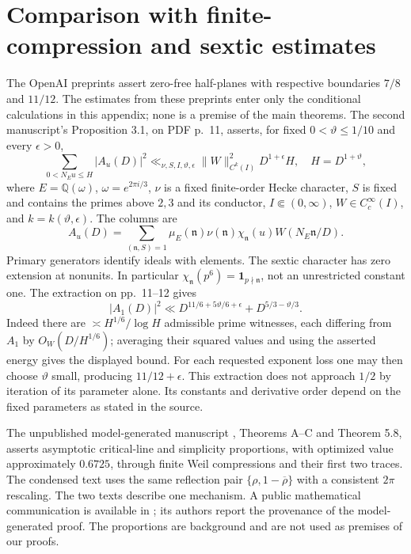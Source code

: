 \documentclass[11pt]{article}
\theoremstyle{remark}\newtheorem{remark}[theorem]{Remark}
\begin{document}
\appendix
\section{Comparison with finite-compression and sextic estimates}\label{app:comparison}
The OpenAI preprints \cite{OpenAI78,OpenAI1112} assert
zero-free half-planes with respective boundaries $7/8$ and $11/12$.
The estimates from these preprints enter only the conditional
calculations in this appendix; none is a premise of the main theorems.
The second manuscript's Proposition 3.1, on PDF p.~11, asserts, for
fixed $0<\vartheta\le1/10$ and every $\epsilon>0$,
\[
 \sum_{0<N_Eu\le H}|A_u(D)|^2
 \ll_{\nu,S,I,\vartheta,\epsilon}\|W\|_{C^k(I)}^2D^{1+\epsilon}H,
 \quad H=D^{1+\vartheta},
\]
where $E=\mathbb Q(\omega)$, $\omega=e^{2\pi i/3}$,
$\nu$ is a fixed finite-order Hecke character, $S$ is fixed and contains
the primes above $2,3$ and its conductor, $I\Subset(0,\infty)$,
$W\in C_c^\infty(I)$, and $k=k(\vartheta,\epsilon)$.
The columns are
\[
 A_u(D)=\sum_{(\mathfrak n,S)=1}
   \mu_E(\mathfrak n)\nu(\mathfrak n)\chi_{\mathfrak n}(u)
   W(N_E\mathfrak n/D).
\]
Primary generators identify ideals with elements. The sextic character
has zero extension at nonunits. In particular
$\chi_{\mathfrak n}(p^6)=\mathbf1_{p\nmid\mathfrak n}$, not an
unrestricted constant one. The extraction on pp.~11--12 gives
\[
 |A_1(D)|^2\ll D^{11/6+5\vartheta/6+\epsilon}
                      +D^{5/3-\vartheta/3}.
\]
Indeed there are $\asymp H^{1/6}/\log H$ admissible prime witnesses,
each differing from $A_1$ by $O_W(D/H^{1/6})$; averaging their squared
values and using the asserted energy gives the displayed bound.
For each requested exponent loss one may then choose $\vartheta$
small, producing $11/12+\epsilon$. This extraction does not approach
$1/2$ by iteration of its parameter alone. Its constants and derivative
order depend on the fixed parameters as stated in the source.

The unpublished model-generated manuscript \cite{ClaudeFull}, Theorems A--C and
Theorem 5.8, asserts asymptotic critical-line and simplicity proportions,
with optimized value approximately $0.6725$, through finite Weil
compressions and their first two traces. The condensed text
\cite{ClaudeShort} uses the same reflection pair
$\{\rho,1-\overline\rho\}$ with a consistent $2\pi$ rescaling.
The two texts describe one mechanism. A public mathematical
communication is available in \cite{AlpogeFurman}; its authors
report the provenance of the model-generated proof. The proportions
are background and are not used as premises of our proofs.
\end{document}
